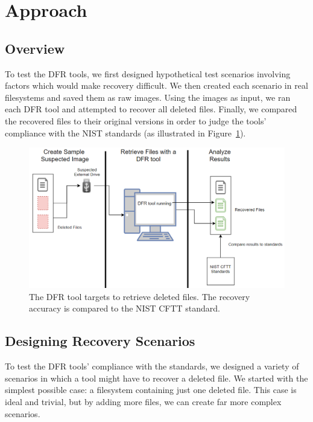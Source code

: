 \section{Approach}

\subsection{Overview}

To test the DFR tools, we first designed hypothetical test scenarios involving factors which would make 
recovery difficult. We then created each scenario in real filesystems and saved them as raw images. 
Using the images as input, we ran each DFR tool and attempted to recover all deleted files. 
Finally, we compared the recovered files to their original versions in order to judge the tools' 
compliance with the NIST standards (as illustrated in Figure~\ref{fig:overview}).

\begin{figure}[h]
    \centering
    \includegraphics[width=\linewidth]{fig/overview.png}
    \caption{The DFR tool targets to retrieve deleted files. The recovery accuracy is compared to the NIST CFTT standard.}
    \label{fig:overview}
\end{figure}

\subsection{Designing Recovery Scenarios}
To test the DFR tools' compliance with the standards, we designed a variety of scenarios in which a tool might have to recover a deleted file. We started with the simplest possible case: a filesystem containing just one deleted file. This case is ideal and trivial, but by adding more files, we can create far more complex scenarios.

